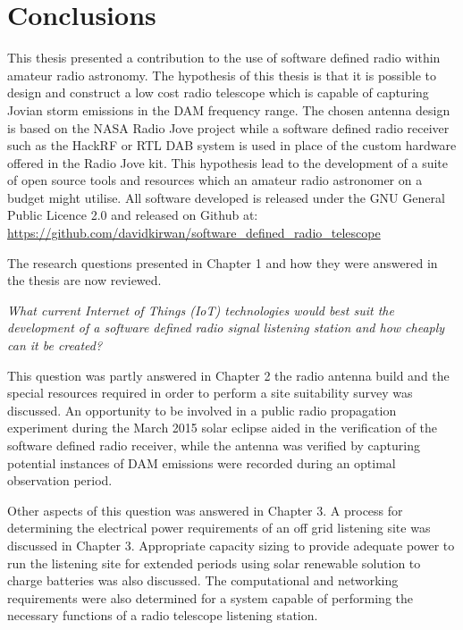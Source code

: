 \newpage
\chapter*{Conclusions}



This thesis presented a contribution to the use of software defined radio within amateur radio astronomy. The hypothesis of this thesis is that it is possible to design and construct a low cost radio telescope which is capable of capturing Jovian storm emissions in the \gls{DAM} frequency range. The chosen antenna design is based on the NASA Radio Jove project while a software defined radio receiver such as the HackRF or RTL DAB system is used in place of the custom hardware offered in the Radio Jove kit. This hypothesis lead to the development of a suite of open source tools and resources which an amateur radio astronomer on a budget might utilise. All software developed is released under the GNU General Public Licence 2.0 and released on Github at: \url{https://github.com/davidkirwan/software\_defined\_radio\_telescope}

The research questions presented in Chapter 1 and how they were answered in the thesis are now reviewed.

\textit{What current Internet of Things (\gls{IoT}) technologies would best suit the development of a software defined radio signal listening station and how cheaply can it be created?}

This question was partly answered in Chapter 2 the radio antenna build and the special resources required in order to perform a site suitability survey was discussed. An opportunity to be involved in a public radio propagation experiment during the March 2015 solar eclipse aided in the verification of the software defined radio receiver, while the antenna was verified by capturing potential instances of \gls{DAM} emissions were recorded during an optimal observation period.

Other aspects of this question was answered in Chapter 3. A process for determining the electrical power requirements of an off grid listening site was discussed in Chapter 3. Appropriate capacity sizing to provide adequate power to run the listening site for extended periods using solar renewable solution to charge batteries was also discussed. The computational and networking requirements were also determined for a system capable of performing the necessary functions of a radio telescope listening station. 

